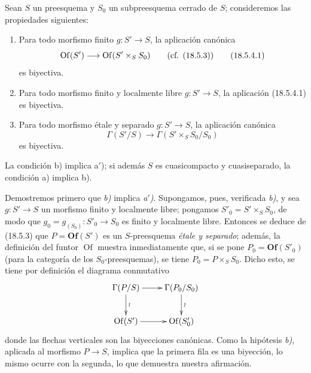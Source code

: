 \begin{proposition}[18.5.4]
\label{IV.18.5.4}
Sean $S$ un preesquema y $S_0$ un subpreesquema cerrado de $S$; consideremos las propiedades siguientes:
\begin{enumerate}
  \item[\textup{a)}] Para todo morfismo \textup{finito} $g:S'\to S$, la aplicación canónica
  \begin{equation}
    \operatorname{Of}(S')\longrightarrow\operatorname{Of}(S'\times_S S_0)\qquad\textup{(cf. (18.5.3))}
    \tag{18.5.4.1}\label{IV.18.5.4.1}
  \end{equation}
  es biyectiva.
  \item[\textup{a$'$)}] Para todo morfismo \textup{finito y localmente libre} $g:S'\to S$, la aplicación \textup{(18.5.4.1)} es biyectiva.


  \item[\textup{b)}] Para todo morfismo \textup{étale y separado} $g:S'\to S$, la aplicación canónica
  \begin{equation}
    \Gamma(S'/S)\longrightarrow\Gamma(S'\times_S S_0/S_0)
    \tag{18.5.4.2}\label{IV.18.5.4.2}
  \end{equation}
  es biyectiva.
\end{enumerate}
La condición \textup{b)} implica \textup{a$'$)}; si además $S$ es cuasicompacto y cuasiseparado, la condición \textup{a)} implica \textup{b)}.
\end{proposition}

Demostremos primero que \emph{b)} implica \emph{a$'$)}. Supongamos, pues, verificada \emph{b)}, y sea $g:S'\to S$ un morfismo finito y localmente libre; pongamos $S'_0=S'\times_S S_0$, de modo que $g_0=g_{(S_0)}:S'_0\to S_0$ es finito y localmente libre. Entonces se deduce de (18.5.3) que $P=\mathbf{Of}(S')$ es un $S$-preesquema \emph{étale y separado}; además, la definición del funtor $\operatorname{Of}$ muestra inmediatamente que, si se pone $P_0=\mathbf{Of}(S'_0)$ (para la categoría de los $S_0$-preesquemas), se tiene $P_0=P\times_S S_0$. Dicho esto, se tiene por definición el diagrama conmutativo
\[
\xymatrix{
  \Gamma(P/S)\ar[r]\ar[d]^{\wr} & \Gamma(P_0/S_0)\ar[d]^{\wr}\\
  \operatorname{Of}(S')\ar[r] & \operatorname{Of}(S'_0)
}
\]
donde las flechas verticales son las biyecciones canónicas. Como la hipótesis \emph{b)}, aplicada al morfismo $P\to S$, implica que la primera fila es una biyección, lo mismo ocurre con la segunda, lo que demuestra nuestra afirmación.

